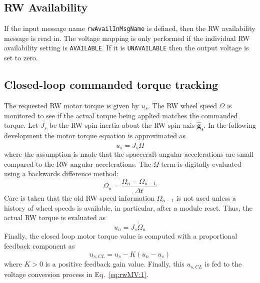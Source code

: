 \subsection{RW Availability} 
If the input message name {\tt rwAvailInMsgName} is defined, then the RW availability message is read in. The voltage mapping is only performed if the individual RW availability setting is {\tt AVAILABLE}.  If it is {\tt UNAVAILABLE} then the output voltage is set to zero.  


\subsection{Closed-loop commanded torque tracking}
The requested RW motor torque is given by $u_{s}$.  The RW wheel speed $\Omega$ is monitored to see if the actual torque being applied matches the commanded torque.  Let $J_{s}$ be the RW spin inertia about the RW spin axis $\hat{\bm g}_{s}$.   In the following development the motor torque equation is approximated as
\begin{equation}
u_{s} = J_{s} \dot\Omega
\end{equation}
where the assumption is made that the spacecraft angular accelerations are small compared to the RW angular accelerations.  The $\dot\Omega$ term is digitally evaluated using a backwards difference method:
\begin{equation}
\dot\Omega_{n} = \frac{\Omega_{n} - \Omega_{n-1}}{\Delta t}
\end{equation}
Care is taken that the old RW speed information $\Omega_{n-1}$ is not used unless a history of wheel speeds is available, in particular, after a module reset.  Thus, the actual RW torque is evaluated as
\begin{equation}
u_{n} = J_{s} \dot\Omega_{n}
\end{equation}
Finally, the closed loop motor torque value is computed with a proportional feedback component as
\begin{equation}
u_{s,CL} = u_{s} - K (u_{n} - u_{s})
\end{equation}
where $K>0$ is a positive feedback gain value.  Finally, this $u_{s,CL}$ is fed to the voltage conversion process in Eq.~\eqref{eq:rwMV:1}.  